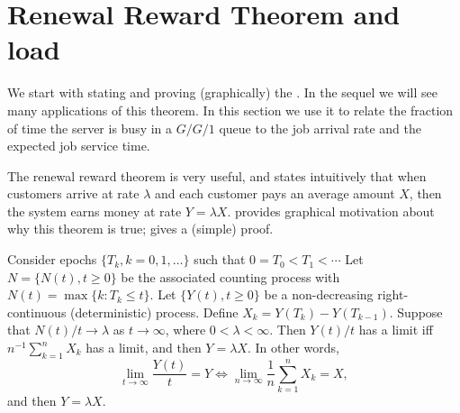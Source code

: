 \section{Renewal Reward Theorem and load}
\label{sec:renew-reward-theor}



We start with stating and proving (graphically) the .
In the sequel we will see many applications of this theorem.
In this section we use it to relate the fraction of time the server is busy in a $G/G/1$ queue to the job arrival rate and the expected job service time.


The renewal reward theorem is very useful, and states intuitively that when customers arrive at rate $\lambda$ and each customer pays an average amount $X$, then the system earns money at rate $Y=\lambda X$.
 provides graphical motivation about why this theorem is true; \citet{el-taha98:_sampl_path_analy_queuein_system} gives a (simple) proof.

\begin{theorem}[Renewal Reward Theorem, $Y=\lambda X$]
  Consider epochs $\{T_k, k=0, 1, \ldots\}$ such that  $0=T_0 < T_1 < \cdots$
  Let $N=\{N(t), t\geq 0\}$ be the associated counting process with $N(t) = \max\{k : T_k \leq t\}$.
  Let $\{Y(t), t\geq 0\}$ be a non-decreasing right-continuous (deterministic) process.
  Define $X_k = Y(T_k)-Y(T_{k-1})$.
  Suppose that $N(t)/t\to\lambda$ as $t\to\infty$, where $0<\lambda < \infty$.
  Then $Y(t)/t$ has a limit iff $n^{-1}\sum_{k=1}^n X_k$ has a limit, and then $Y=\lambda X$. In other words, 
 \begin{equation*}
   \lim_{t \to \infty} \frac{Y(t)}t=Y \iff \lim_{n \to \infty} \frac 1n\sum_{k=1}^n X_k = X, 
 \end{equation*}
and then $Y=\lambda X$. 
\end{theorem}


